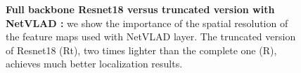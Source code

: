 \begin{figure}
\begin{minipage}{0.65\linewidth}
\begin{minipage}{0.5\linewidth}
		\end{minipage}
	\end{minipage}\hfill
	\begin{minipage}{0.35\linewidth}
		\caption{\label{fig:trunc_resnet} \textbf{Full backbone Resnet18 versus truncated version with NetVLAD :} we show the importance of the spatial resolution of the feature maps used with NetVLAD layer. The truncated version of Resnet18 (Rt), two times lighter than the complete one (R), achieves much better localization results.}
	\end{minipage}
\end{figure}